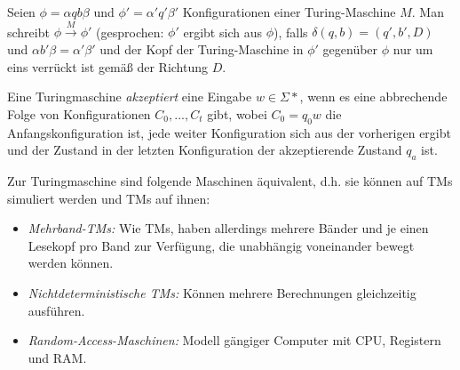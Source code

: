 \documentclass{cheat-sheet}
\begin{document}
\begin{defn}
Seien $\phi = \alpha q b \beta$ und $\phi' = \alpha ' q' \beta '$ Konfigurationen einer Turing-Maschine $M$. Man schreibt $\phi \xrightarrow{M} \phi'$ (gesprochen: $\phi'$ ergibt sich aus $\phi$), falls $\delta(q, b) = (q', b', D)$ und $\alpha b' \beta = \alpha' \beta'$ und der Kopf der Turing-Maschine in $\phi'$ gegenüber $\phi$ nur um eins verrückt ist gemäß der Richtung $D$.
\end{defn}

\begin{defn}
Eine Turingmaschine \emph{akzeptiert} eine Eingabe $w \in \Sigma*$, wenn es eine abbrechende Folge von Konfigurationen $C_{0}, ..., C_{t}$ gibt, wobei $C_{0} = q_{0}w$ die Anfangskonfiguration ist, jede weiter Konfiguration sich aus der vorherigen ergibt und der Zustand in der letzten Konfiguration der akzeptierende Zustand $q_{a}$ ist.
\end{defn}


\begin{bem}
Zur Turingmaschine sind folgende Maschinen äquivalent, d.h. sie können auf TMs simuliert werden und TMs auf ihnen:
  \begin{itemize}
    \item \emph{Mehrband-TMs:} Wie TMs, haben allerdings mehrere Bänder und je einen Lesekopf pro Band zur Verfügung, die unabhängig voneinander bewegt werden können.
    \item \emph{Nichtdeterministische TMs:} Können mehrere Berechnungen gleichzeitig ausführen.
    \item \emph{Random-Access-Maschinen:} Modell gängiger Computer mit CPU, Registern und RAM.
  \end{itemize}
\end{bem}
\end{document}
